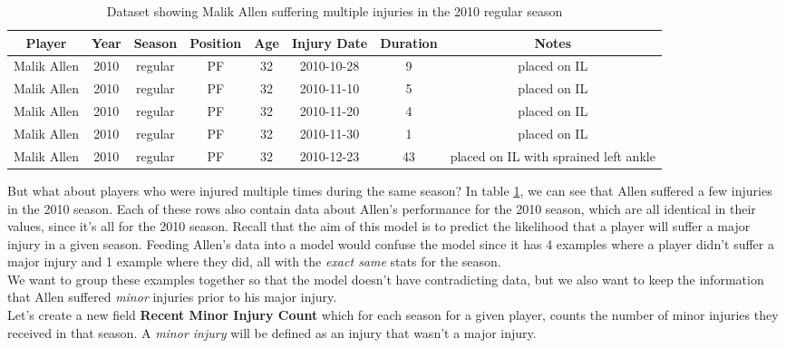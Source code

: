 \documentclass{article}
\begin{document}
\begin{center}
    \begin{table}
    \begin{tabular}{||c c c c c c c c||}
    \hline
    Player & Year & Season & Position & Age & Injury Date & Duration & Notes \\ [0.5ex]
    \hline\hline
    Malik Allen & 2010 & regular & PF & 32 & 2010-10-28 & 9 & placed on IL \\
    \hline
    Malik Allen & 2010 & regular & PF & 32 & 2010-11-10 & 5 & placed on IL \\
    \hline
    Malik Allen & 2010 & regular & PF & 32 & 2010-11-20 & 4 & placed on IL \\
    \hline
    Malik Allen & 2010 & regular & PF & 32 & 2010-11-30 & 1 & placed on IL \\
    \hline
    Malik Allen & 2010 & regular & PF & 32 & 2010-12-23 & 43 & placed on IL with sprained left ankle\\ [1ex]
    \hline
   \end{tabular}
   \caption{\label{tab:multiple-injuries}Dataset showing Malik Allen suffering multiple injuries in the 2010 regular season}
    \end{table}
\end{center}

But what about players who were injured multiple times during the same season? In table \ref{tab:multiple-injuries}, we can see
that Allen suffered a few injuries in the 2010 season. Each of these rows also contain data about
Allen's performance for the 2010 season, which are all identical in their values, since it's all for the
2010 season. Recall that the aim of this model is to predict the likelihood that
a player will suffer a major injury in a given season. Feeding Allen's data into a model
would confuse the model since it has 4 examples where a player didn't suffer a major injury
and 1 example where they did, all with the \emph{exact same} stats for the season.\\

We want to group these examples together so that the model doesn't have contradicting data,
but we also want to keep the information that Allen suffered \emph{minor} injuries
prior to his major injury.\\

Let's create a new field \textbf{Recent Minor Injury Count} which for each
season for a given player, counts the number of minor injuries they received in that season.
A \emph{minor injury} will be defined as an injury that wasn't a major injury.
\end{document}
